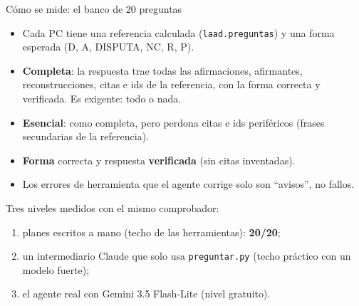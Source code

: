 \documentclass[aspectratio=169,10pt]{beamer}
\newcommand{\ttt}[1]{\texttt{\small #1}}
\newcommand{\cifra}[1]{\textbf{\alert{#1}}}
\begin{document}
\begin{frame}{Cómo se mide: el banco de 20 preguntas}
\begin{itemize}\small
\item Cada PC tiene una \alert{referencia} calculada (\ttt{laad.preguntas}) y una forma esperada (D, A, DISPUTA, NC, R, P).
\item \textbf{Completa}: la respuesta trae todas las afirmaciones, afirmantes, reconstrucciones, citas e ids de la
      referencia, con la forma correcta y verificada. Es exigente: todo o nada.
\item \textbf{Esencial}: como completa, pero perdona citas e ids \alert{periféricos} (frases secundarias de la referencia).
\item \textbf{Forma} correcta y respuesta \textbf{verificada} (sin citas inventadas).
\item Los errores de herramienta que el agente corrige solo son \enquote{avisos}, no fallos.
\end{itemize}
\medskip
\small
Tres niveles medidos con el mismo comprobador:
\begin{enumerate}\small
\item planes escritos a mano (techo de las herramientas): \cifra{20/20};
\item un intermediario Claude que solo usa \ttt{preguntar.py} (techo práctico con un modelo fuerte);
\item el agente real con Gemini 3.5 Flash-Lite (nivel gratuito).
\end{enumerate}
\end{frame}
\end{document}

